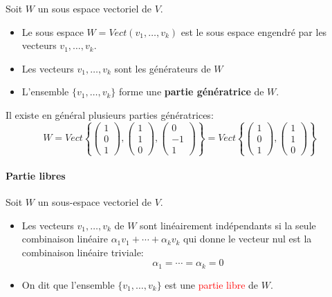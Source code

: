 

Soit $W$ un sous espace vectoriel de $V$.
\begin{itemize}
    \item Le sous espace $W = Vect(v_1, \dots, v_k)$ est le sous espace engendré par les vecteurs $v_1, \dots, v_k$.
    \item Les vecteurs $v_1, \dots, v_k$ sont les générateurs de $W$
    \item L'ensemble $\{v_1, \dots, v_k\}$ forme une \textbf{partie génératrice} de $W$.
\end{itemize}
\begin{exemple}
    Il existe en général plusieurs parties génératrices:
    \[W = Vect\left\{\begin{pmatrix}
        1 \\ 0 \\ 1
    \end{pmatrix}, \begin{pmatrix}
        1 \\ 1 \\ 0
    \end{pmatrix}, \begin{pmatrix}
        0 \\ -1 \\ 1
    \end{pmatrix}\right\} = Vect\left\{\begin{pmatrix}
        1 \\ 0 \\ 1
    \end{pmatrix}, \begin{pmatrix}
        1 \\ 1 \\ 0
    \end{pmatrix}\right\}\]
\end{exemple}
\paragraph{Partie libres}
Soit $W$ un sous-espace vectoriel de $V$.
\begin{itemize}
    \item Les vecteurs $v_1, \dots, v_k$ de $W$ sont linéairement indépendants si la seule combinaison linéaire $\alpha_1v_1 + \cdots + \alpha_kv_k$ qui donne le vecteur nul est la combinaison linéaire triviale:
    \[\alpha_1 = \cdots = \alpha_k = 0\]

    \item On dit que l'ensemble $\{v_1, \dots, v_k\}$ est une \textcolor{red}{partie libre} de $W$.
\end{itemize}

